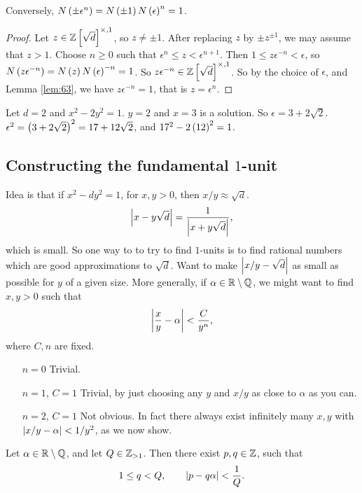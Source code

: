 Conversely, $ N\left( \pm \epsilon^n \right) = N\left( \pm 1 \right)N\left( \epsilon \right)^n = 1 $.

\begin{proof}
Let $ z \in \mathbb{Z}\left[ \sqrt{d} \right]^{\times, 1} $, so $ z \ne \pm 1 $. After replacing $ z $ by $ \pm z^{\pm 1} $, we may assume that $ z > 1 $. Choose $ n \ge 0 $ such that $ \epsilon^n \le z < \epsilon^{n + 1} $. Then $ 1 \le z\epsilon^{-n} < \epsilon $, so $ N\left( z\epsilon^{-n} \right) = N\left( z \right)N\left( \epsilon \right)^{-n} = 1 $. So $ z\epsilon^{-n} \in \mathbb{Z}\left[ \sqrt{d} \right]^{\times, 1} $. So by the choice of $ \epsilon $, and Lemma \ref{lem:63}, we have $ z\epsilon^{-n} = 1 $, that is $ z = \epsilon^n $.
\end{proof}

\begin{example2}
Let $ d = 2 $ and $ x^2 - 2y^2 = 1 $. $ y = 2 $ and $ x = 3 $ is a solution. So $ \epsilon = 3 + 2\sqrt{2} $. $ \epsilon^2 = \left( 3 + 2\sqrt{2} \right)^2 = 17 + 12\sqrt{2} $, and $ 17^2 - 2\left( 12 \right)^2  = 1 $.
\end{example2}

\subsection{Constructing the fundamental $ 1 $-unit}

Idea is that if $ x^2 - dy^2 = 1 $, for $ x, y > 0 $, then $ x / y \approx \sqrt{d} $.
$$ \left\lvert x - y\sqrt{d} \right\rvert = \dfrac{1}{\left\lvert x + y\sqrt{d} \right\rvert}, $$
which is small. So one way to to try to find $ 1 $-units is to find rational numbers which are good approximations to $ \sqrt{d} $. Want to make $ \left\lvert x / y - \sqrt{d} \right\rvert $ as small as possible for $ y $ of a given size. More generally, if $ \alpha \in \mathbb{R} \setminus \mathbb{Q} $, we might want to find $ x, y > 0 $ such that
$$ \left\lvert \dfrac{x}{y} - \alpha \right\rvert < \dfrac{C}{y^n}, $$
where $ C, n $ are fixed.
\begin{itemize}[leftmargin=1in]
\item[$ n = 0 $] Trivial.
\item[$ n = 1 $, $ C = 1 $] Trivial, by just choosing any $ y $ and $ x / y $ as close to $ \alpha $ as you can.
\item[$ n = 2 $, $ C = 1 $] Not obvious. In fact there always exist infinitely many $ x, y $ with $ \left\lvert x / y - \alpha \right\rvert < 1 / y^2 $, as we now show.
\end{itemize}

\begin{theorem}
\label{thm:65}
Let $ \alpha \in \mathbb{R} \setminus \mathbb{Q} $, and let $ Q \in \mathbb{Z}_{> 1} $. Then there exist $ p, q \in \mathbb{Z} $, such that
$$ 1 \le q < Q, \qquad \left\lvert p - q\alpha \right\rvert < \dfrac{1}{Q}. $$
\end{theorem}

